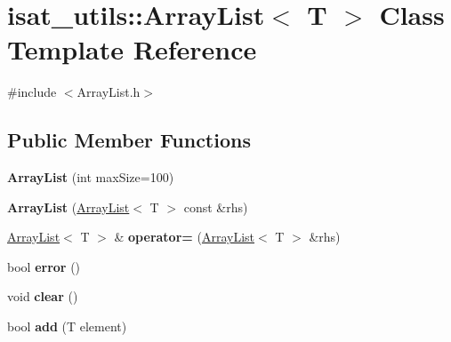 \hypertarget{classisat__utils_1_1_array_list}{}\section{isat\+\_\+utils\+:\+:Array\+List$<$ T $>$ Class Template Reference}
\label{classisat__utils_1_1_array_list}


{\ttfamily \#include $<$Array\+List.\+h$>$}

\subsection*{Public Member Functions}
\begin{DoxyCompactItemize}
\item 
{\bfseries Array\+List} (int max\+Size=100)\hypertarget{classisat__utils_1_1_array_list_a047dfeb4558a3c00f4a7869e483e5560}{}\label{classisat__utils_1_1_array_list_a047dfeb4558a3c00f4a7869e483e5560}

\item 
{\bfseries Array\+List} (\hyperlink{classisat__utils_1_1_array_list}{Array\+List}$<$ T $>$ const \&rhs)\hypertarget{classisat__utils_1_1_array_list_aadad63e6e7467804583692241e48e7f3}{}\label{classisat__utils_1_1_array_list_aadad63e6e7467804583692241e48e7f3}

\item 
\hyperlink{classisat__utils_1_1_array_list}{Array\+List}$<$ T $>$ \& {\bfseries operator=} (\hyperlink{classisat__utils_1_1_array_list}{Array\+List}$<$ T $>$ \&rhs)\hypertarget{classisat__utils_1_1_array_list_a181b240f65d9070a2481899aaced9041}{}\label{classisat__utils_1_1_array_list_a181b240f65d9070a2481899aaced9041}

\item 
bool {\bfseries error} ()\hypertarget{classisat__utils_1_1_array_list_a4030036863ef8b6b91b5081aa55dbddd}{}\label{classisat__utils_1_1_array_list_a4030036863ef8b6b91b5081aa55dbddd}

\item 
void {\bfseries clear} ()\hypertarget{classisat__utils_1_1_array_list_a94ef082dc86abf943a4f4d37ad7df655}{}\label{classisat__utils_1_1_array_list_a94ef082dc86abf943a4f4d37ad7df655}

\item 
bool {\bfseries add} (T element)\hypertarget{classisat__utils_1_1_array_list_aa8bc6b5d62c88f7d578e8ffd2cd203d6}{}\label{classisat__utils_1_1_array_list_aa8bc6b5d62c88f7d578e8ffd2cd203d6}


\end{DoxyCompactItemize}
